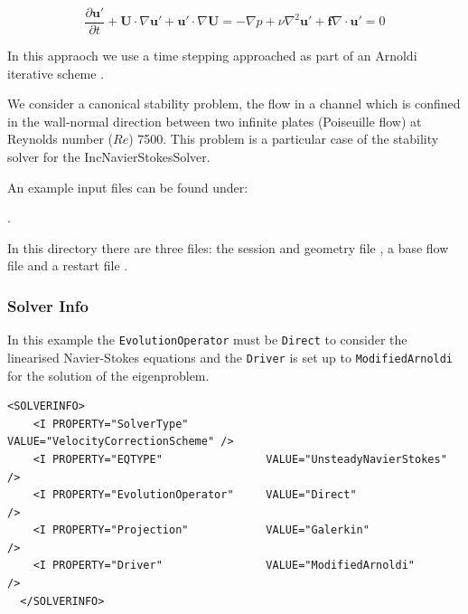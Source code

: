   \begin{subequations}
  \begin{equation}
    \frac{\partial \mathbf{u'}}{\partial t} + \mathbf{U} \cdot  \nabla \mathbf{u'}+\mathbf{u'} \cdot \nabla \mathbf{U} = -\nabla p + \nu \nabla^2 \mathbf{u'} + \mathbf{f}
  \end{equation}

  \begin{equation}
  \nabla \cdot \mathbf{u'} = 0
  \end{equation}
  \end{subequations}

In this appraoch we use a time stepping approached as part of an
Arnoldi iterative scheme \cite{BiGlobal}.
  
We consider a canonical stability problem, the flow in a channel which
is confined in the wall-normal direction between two infinite plates
(Poiseuille flow) at Reynolds number ($Re$) 7500. This problem is a
particular case of the stability solver for the IncNavierStokesSolver.

An example input files can be found under:

.

In this directory there are three files: the session and geometry file
, a base flow file 
and a restart file . 

\subsubsection*{Solver Info}

 In this example the \texttt{EvolutionOperator} must be
 \texttt{Direct} to consider the linearised Navier-Stokes equations
 and the \texttt{Driver} is set up to \texttt{ModifiedArnoldi} for
 the solution of the eigenproblem.

\begin{lstlisting}[style=XMLStyle]
  <SOLVERINFO>
    <I PROPERTY="SolverType"            VALUE="VelocityCorrectionScheme" />
    <I PROPERTY="EQTYPE"                VALUE="UnsteadyNavierStokes"     />
    <I PROPERTY="EvolutionOperator"     VALUE="Direct"                   />
    <I PROPERTY="Projection"            VALUE="Galerkin"                 />
    <I PROPERTY="Driver"                VALUE="ModifiedArnoldi"         />
  </SOLVERINFO>
\end{lstlisting}


